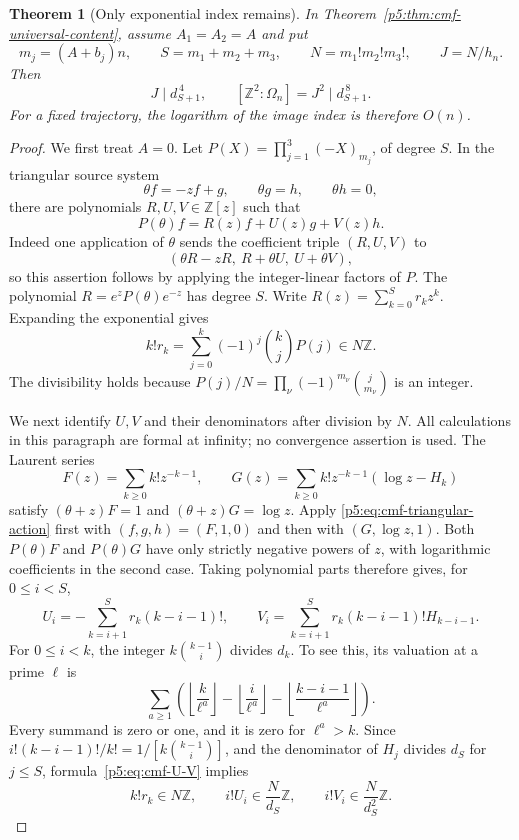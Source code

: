 \documentclass[11pt,a4paper]{article}
\newtheorem{theorem}{Theorem}[section]
\theoremstyle{definition}
\theoremstyle{remark}
\numberwithin{equation}{section}
\begin{document}
\begin{theorem}[Only exponential index remains]
\label{p5:thm:cmf-lcm-index}
In Theorem~\ref{p5:thm:cmf-universal-content}, assume $A_1=A_2=A$ and put
\[
 m_j=(A+b_j)n,\qquad S=m_1+m_2+m_3,\qquad
 N=m_1!m_2!m_3!,\qquad J=N/h_n.
\]
Then
\begin{equation}\label{p5:eq:cmf-lcm-index}
 J\mid d_{S+1}^{\,4},\qquad
 [\mathbb Z^2:\Omega_n]=J^2\mid d_{S+1}^{\,8}.
\end{equation}
For a fixed trajectory, the logarithm of the image index is therefore
$O(n)$.
\end{theorem}
\begin{proof}
We first treat $A=0$. Let
$P(X)=\prod_{j=1}^3(-X)_{m_j}$, of degree $S$.
In the triangular source system
\[
 \theta f=-zf+g,\qquad \theta g=h,\qquad \theta h=0,
\]
there are polynomials $R,U,V\in\mathbb Z[z]$ such that
\begin{equation}\label{p5:eq:cmf-triangular-action}
 P(\theta)f=R(z)f+U(z)g+V(z)h.
\end{equation}
Indeed one application of $\theta$ sends the coefficient triple
$(R,U,V)$ to
\[
 (\theta R-zR,\ R+\theta U,\ U+\theta V),
\]
so this assertion follows by applying the integer-linear factors of $P$.
The polynomial $R=e^zP(\theta)e^{-z}$ has degree $S$. Write
$R(z)=\sum_{k=0}^S r_kz^k$. Expanding the exponential gives
\[
 k!r_k=\sum_{j=0}^k(-1)^j\binom kjP(j)\in N\mathbb Z.
\]
The divisibility holds because
$P(j)/N=\prod_\nu(-1)^{m_\nu}\binom{j}{m_\nu}$ is an integer.

We next identify $U,V$ and their denominators after division by $N$.
All calculations in this paragraph are formal at infinity; no
convergence assertion is used. The Laurent series
\[
 F(z)=\sum_{k\ge0}k!z^{-k-1},\qquad
 G(z)=\sum_{k\ge0}k!z^{-k-1}(\log z-H_k)
\]
satisfy $(\theta+z)F=1$ and $(\theta+z)G=\log z$.
Apply \eqref{p5:eq:cmf-triangular-action} first with
$(f,g,h)=(F,1,0)$ and then with $(G,\log z,1)$.
Both $P(\theta)F$ and $P(\theta)G$ have only strictly negative
powers of $z$, with logarithmic coefficients in the second case.
Taking polynomial parts therefore gives, for $0\le i<S$,
\begin{equation}\label{p5:eq:cmf-U-V}
 U_i=-\sum_{k=i+1}^S r_k(k-i-1)!,\qquad
 V_i=\sum_{k=i+1}^S r_k(k-i-1)!H_{k-i-1}.
\end{equation}
For $0\le i<k$, the integer
$k\binom{k-1}{i}$ divides $d_k$. To see this, its valuation at a
prime $\ell$ is
\[
 \sum_{a\ge1}\left(
  \left\lfloor\frac{k}{\ell^a}\right\rfloor
 -\left\lfloor\frac{i}{\ell^a}\right\rfloor
 -\left\lfloor\frac{k-i-1}{\ell^a}\right\rfloor\right).
\]
Every summand is zero or one, and it is zero for $\ell^a>k$.
Since
$i!(k-i-1)!/k!=1/[k\binom{k-1}{i}]$, and the denominator of
$H_j$ divides $d_S$ for $j\le S$, formula~\eqref{p5:eq:cmf-U-V}
implies
\begin{equation}\label{p5:eq:cmf-weighted-integrality}
 k!r_k\in N\mathbb Z,\qquad
 i!U_i\in \frac{N}{d_S}\mathbb Z,\qquad
 i!V_i\in \frac{N}{d_S^2}\mathbb Z.
\end{equation}


\end{proof}
\end{document}
